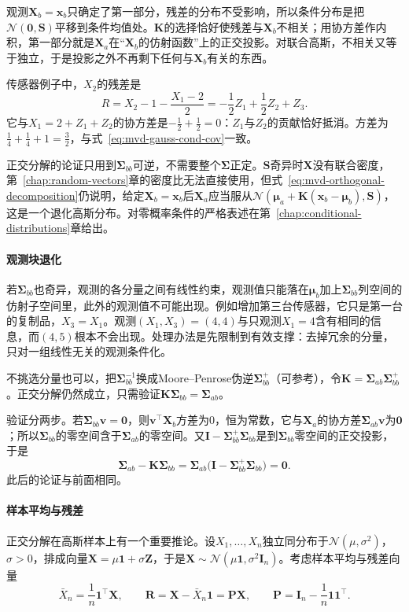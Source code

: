 观测$\bm{X}_b=\bm{x}_b$只确定了第一部分，残差的分布不受影响，所以条件分布是把$\mathcal{N}(\bm{0},\bm{S})$平移到条件均值处。$\bm{K}$的选择恰好使残差与$\bm{X}_b$不相关；用协方差作内积，第一部分就是$\bm{X}_a$在“$\bm{X}_b$的仿射函数”上的正交投影。对联合高斯，不相关又等于独立，于是投影之外不再剩下任何与$\bm{X}_b$有关的东西。

传感器例子中，$X_2$的残差是
\[
 R=X_2-1-\frac{X_1-2}{2}=-\frac12Z_1+\frac12Z_2+Z_3 .
\]
它与$X_1=2+Z_1+Z_2$的协方差是$-\tfrac12+\tfrac12=0$：$Z_1$与$Z_2$的贡献恰好抵消。方差为$\tfrac14+\tfrac14+1=\tfrac32$，与式~\eqref{eq:mvd-gauss-cond-cov}一致。

正交分解的论证只用到$\bm{\Sigma}_{bb}$可逆，不需要整个$\bm{\Sigma}$正定。$\bm{S}$奇异时$\bm{X}$没有联合密度，第~\ref{chap:random-vectors}章的密度比无法直接使用，但式~\eqref{eq:mvd-orthogonal-decomposition}仍说明，给定$\bm{X}_b=\bm{x}_b$后$\bm{X}_a$应当服从$\mathcal{N}(\bm{\mu}_a+\bm{K}(\bm{x}_b-\bm{\mu}_b),\bm{S})$，这是一个退化高斯分布。对零概率条件的严格表述在第~\ref{chap:conditional-distributions}章给出。

\paragraph{观测块退化}
若$\bm{\Sigma}_{bb}$也奇异，观测的各分量之间有线性约束，观测值只能落在$\bm{\mu}_b$加上$\bm{\Sigma}_{bb}$列空间的仿射子空间里，此外的观测值不可能出现。例如增加第三台传感器，它只是第一台的复制品，$X_3=X_1$。观测$(X_1,X_3)=(4,4)$与只观测$X_1=4$含有相同的信息，而$(4,5)$根本不会出现。处理办法是先限制到有效支撑：去掉冗余的分量，只对一组线性无关的观测条件化。

不挑选分量也可以，把$\bm{\Sigma}_{bb}^{-1}$换成Moore--Penrose伪逆$\bm{\Sigma}_{bb}^{+}$（可参考），令$\bm{K}=\bm{\Sigma}_{ab}\bm{\Sigma}_{bb}^{+}$。正交分解仍然成立，只需验证$\bm{K}\bm{\Sigma}_{bb}=\bm{\Sigma}_{ab}$。

验证分两步。若$\bm{\Sigma}_{bb}\bm{v}=\bm{0}$，则$\bm{v}^{\top}\bm{X}_b$方差为$0$，恒为常数，它与$\bm{X}_a$的协方差$\bm{\Sigma}_{ab}\bm{v}$为$\bm{0}$；所以$\bm{\Sigma}_{bb}$的零空间含于$\bm{\Sigma}_{ab}$的零空间。又$\bm{I}-\bm{\Sigma}_{bb}^{+}\bm{\Sigma}_{bb}$是到$\bm{\Sigma}_{bb}$零空间的正交投影，于是
\[
 \bm{\Sigma}_{ab}-\bm{K}\bm{\Sigma}_{bb}=\bm{\Sigma}_{ab}\bigl(\bm{I}-\bm{\Sigma}_{bb}^{+}\bm{\Sigma}_{bb}\bigr)=\bm{0} .
\]
此后的论证与前面相同。

\paragraph{样本平均与残差}
正交分解在高斯样本上有一个重要推论。设$X_1,\ldots,X_n$独立同分布于$\mathcal{N}(\mu,\sigma^{2})$，$\sigma>0$，排成向量$\bm{X}=\mu\bm{1}+\sigma\bm{Z}$，于是$\bm{X}\sim\mathcal{N}(\mu\bm{1},\sigma^{2}\bm{I}_n)$。考虑样本平均与残差向量
\[
 \bar{X}_n=\frac1n\bm{1}^{\top}\bm{X},\qquad \bm{R}=\bm{X}-\bar{X}_n\bm{1}=\bm{P}\bm{X},\qquad \bm{P}=\bm{I}_n-\frac1n\bm{1}\bm{1}^{\top} .
\]

